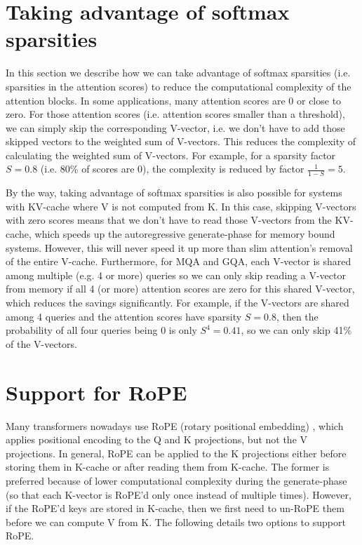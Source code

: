\documentclass{article}
\begin{document}
\section{Taking advantage of softmax sparsities}
In this section we describe how we can take advantage of softmax sparsities (i.e. sparsities in the attention scores) to reduce the computational complexity of the attention blocks. In some applications, many attention scores are 0 or close to zero. For those attention scores (i.e. attention scores smaller than a threshold), we can simply skip the corresponding V-vector, i.e. we don’t have to add those skipped vectors to the weighted sum of V-vectors. This reduces the complexity of calculating the weighted sum of V-vectors. For example, for a sparsity factor $S = 0.8$ (i.e. 80\% of scores are 0), the complexity is reduced by factor $\frac{1}{1 - S} = 5$.

By the way, taking advantage of softmax sparsities is also possible for systems with KV-cache where V is not computed from K. In this case, skipping V-vectors with zero scores means that we don’t have to read those V-vectors from the KV-cache, which speeds up the autoregressive generate-phase for memory bound systems. However, this will never speed it up more than slim attention's removal of the entire V-cache. Furthermore, for MQA and GQA, each V-vector is shared among multiple (e.g. 4 or more) queries so we can only skip reading a V-vector from memory if all 4 (or more) attention scores are zero for this shared V-vector, which reduces the savings significantly. For example, if the V-vectors are shared among 4 queries and the attention scores have sparsity $S = 0.8$, then the probability of all four queries being 0 is only $S^4 = 0.41$, so we can only skip 41\% of the V-vectors.

\section{Support for RoPE}
Many transformers nowadays use RoPE (rotary positional embedding) \citep{RoPE}, which applies positional encoding to the Q and K projections, but not the V projections. In general, RoPE can be applied to the K projections either before storing them in K-cache or after reading them from K-cache. The former is preferred because of lower computational complexity during the generate-phase (so that each K-vector is RoPE’d only once instead of multiple times). However, if the RoPE’d keys are stored in K-cache, then we first need to un-RoPE them before we can compute V from K. The following details two options to support RoPE.
\end{document}
